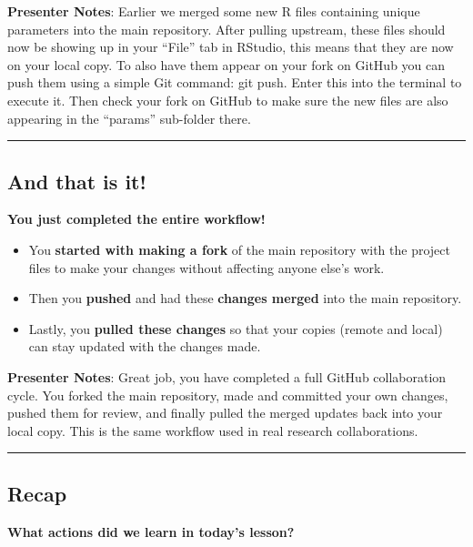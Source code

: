 \documentclass[
  letterpaper,
  DIV=11,
  numbers=noendperiod]{scrartcl}
\providecommand{\tightlist}{%
  \setlength{\itemsep}{0pt}\setlength{\parskip}{0pt}}
\begin{document}
\textbf{Presenter Notes}: Earlier we merged some new R files containing
unique parameters into the main repository. After pulling upstream,
these files should now be showing up in your ``File'' tab in RStudio,
this means that they are now on your local copy. To also have them
appear on your fork on GitHub you can push them using a simple Git
command: git push. Enter this into the terminal to execute it. Then
check your fork on GitHub to make sure the new files are also appearing
in the ``params'' sub-folder there.

\begin{center}\rule{0.5\linewidth}{0.5pt}\end{center}

\subsection{And that is it!}\label{and-that-is-it}

\textbf{You just completed the entire workflow!}

\begin{itemize}
\tightlist
\item
  You \textbf{started with making a fork} of the main repository with
  the project files to make your changes without affecting anyone else's
  work.
\item
  Then you \textbf{pushed} and had these \textbf{changes merged} into
  the main repository.
\item
  Lastly, you \textbf{pulled these changes} so that your copies (remote
  and local) can stay updated with the changes made.
\end{itemize}

\textbf{Presenter Notes}: Great job, you have completed a full GitHub
collaboration cycle. You forked the main repository, made and committed
your own changes, pushed them for review, and finally pulled the merged
updates back into your local copy. This is the same workflow used in
real research collaborations.

\begin{center}\rule{0.5\linewidth}{0.5pt}\end{center}

\subsection{Recap}\label{recap}

\textbf{What actions did we learn in today's lesson?}
\end{document}
